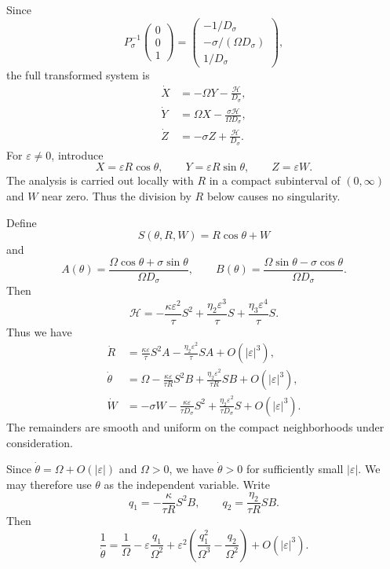 \documentclass[11pt,reqno]{amsart}
\theoremstyle{plain}
\theoremstyle{definition}
\theoremstyle{remark}
\begin{document}
Since
\[
P_\sigma^{-1}
\begin{pmatrix}0\\0\\1\end{pmatrix}
=
\begin{pmatrix}
-1/D_\sigma\\
-\sigma/(\Omega D_\sigma)\\
1/D_\sigma
\end{pmatrix},
\]
the full transformed system is
\[
\begin{aligned}
\dot X&=-\Omega Y-\frac{\mathcal H}{D_\sigma},\\
\dot Y&=\Omega X-\frac{\sigma\mathcal H}{\Omega D_\sigma},\\
\dot Z&=-\sigma Z+\frac{\mathcal H}{D_\sigma}.
\end{aligned}
\]
For $\varepsilon\neq0$, introduce
\begin{equation}
\label{eq:classical-scaled-polar}
X=\varepsilon R\cos\theta,\qquad
Y=\varepsilon R\sin\theta,\qquad
Z=\varepsilon W.
\end{equation}
The analysis is carried out locally with $R$ in a compact
subinterval of $(0,\infty)$ and $W$ near zero. Thus the
division by $R$ below causes no singularity.

Define
\[
S(\theta,R,W)=R\cos\theta+W
\]
and
\[
A(\theta)=
\frac{\Omega\cos\theta+\sigma\sin\theta}{\Omega D_\sigma},
\qquad
B(\theta)=
\frac{\Omega\sin\theta-\sigma\cos\theta}{\Omega D_\sigma}.
\]
Then
\[
\mathcal H
=
-\frac{\kappa\varepsilon^2}{\tau}S^2
+\frac{\eta_2\varepsilon^3}{\tau}S
+\frac{\eta_3\varepsilon^4}{\tau}S.
\]
Thus we have
\[
\begin{aligned}
\dot R
&=
\frac{\kappa\varepsilon}{\tau}S^2A
-\frac{\eta_2\varepsilon^2}{\tau}SA
+O(|\varepsilon|^3),\\
\dot\theta
&=
\Omega-\frac{\kappa\varepsilon}{\tau R}S^2B
+\frac{\eta_2\varepsilon^2}{\tau R}SB
+O(|\varepsilon|^3),\\
\dot W
&=
-\sigma W-\frac{\kappa\varepsilon}{\tau D_\sigma}S^2
+\frac{\eta_2\varepsilon^2}{\tau D_\sigma}S
+O(|\varepsilon|^3).
\end{aligned}
\]
The remainders are smooth and uniform on the compact
neighborhoods under consideration.

Since $\dot\theta=\Omega+O(|\varepsilon|)$ and $\Omega>0$,
we have $\dot\theta>0$ for sufficiently small
$|\varepsilon|$. We may therefore use $\theta$ as the
independent variable. Write
\[
q_1=-\frac{\kappa}{\tau R}S^2B,\qquad
q_2=\frac{\eta_2}{\tau R}SB.
\]
Then
\[
\frac1{\dot\theta}
=
\frac1\Omega-\varepsilon\frac{q_1}{\Omega^2}
+\varepsilon^2
\left(\frac{q_1^2}{\Omega^3}-\frac{q_2}{\Omega^2}\right)
+O(|\varepsilon|^3).
\]
\end{document}
